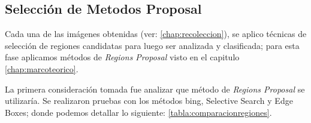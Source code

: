 \subsection{Selección de Metodos Proposal}\label{sub:proposal}

Cada una de las imágenes obtenidas (ver: \ref{chap:recoleccion}), se aplico técnicas de selección de regiones candidatas para luego ser analizada y clasificada; para esta fase aplicamos métodos de \textit{Regions Proposal} visto en el capitulo \ref{chap:marcoteorico}.




La primera  consideración tomada fue analizar que método de \textit{Regions Proposal} se utilizaría. Se realizaron pruebas con los métodos \ac{bing}, Selective Search y Edge Boxes; donde podemos detallar lo siguiente: \ref{tabla:comparacionregiones}.


